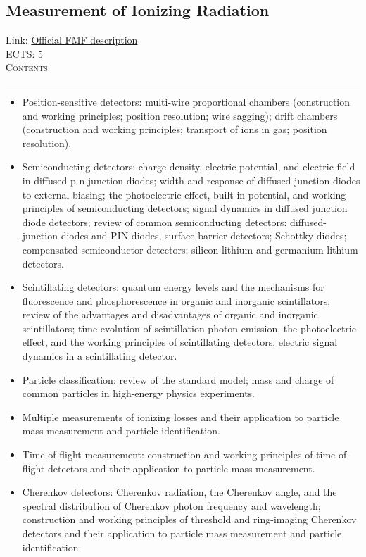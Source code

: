 \documentclass[11pt, a4paper]{article}
\newenvironment{course}[3]{
\subsection{#1}%
Link: \href{#2}{Official FMF description}\\%
ECTS: #3%
\vspace{1ex}
\\
{\large \textsc{Contents}}\\[-0.9ex]%
\rule{\textwidth}{0.5pt}
\vspace{-3ex}
}
{}
\newenvironment{chapter}[1]{
\begin{tcolorbox}[title=#1, breakable]
}
{\end{tcolorbox}}
\begin{document}
\begin{course}{Measurement of Ionizing Radiation}{https://www.fmf.uni-lj.si/en/study-physics/programmes/1fiz/2020/7000777/courses/1446/}{5}
\begin{chapter}{Particle detectors}
\begin{itemize}
            \item Position-sensitive detectors: multi-wire proportional chambers (construction and working principles; position resolution; wire sagging); drift chambers (construction and working principles; transport of ions in gas; position resolution).

            \item Semiconducting detectors: charge density, electric potential, and electric field in diffused p-n junction diodes; width and response of diffused-junction diodes to external biasing; the photoelectric effect, built-in potential, and working principles of semiconducting detectors; signal dynamics in diffused junction diode detectors; review of common semiconducting detectors: diffused-junction diodes and PIN diodes, surface barrier detectors; Schottky diodes; compensated semiconductor detectors; silicon-lithium and germanium-lithium detectors.

            \item Scintillating detectors: quantum energy levels and the mechanisms for fluorescence and phosphorescence in organic and inorganic scintillators; review of the advantages and disadvantages of organic and inorganic scintillators; time evolution of scintillation photon emission, the photoelectric effect, and the working principles of scintillating detectors; electric signal dynamics in a scintillating detector.

        \end{itemize}
    \end{chapter}

    \begin{chapter}{Particle identification}
        \begin{itemize}
        
            \item Particle classification: review of the standard model; mass and charge of common particles in high-energy physics experiments.

            \item Multiple measurements of ionizing losses and their application to particle mass measurement and particle identification.

            \item Time-of-flight measurement: construction and working principles of time-of-flight detectors and their application to particle mass measurement.

            \item Cherenkov detectors: Cherenkov radiation, the Cherenkov angle, and the spectral distribution of Cherenkov photon frequency and wavelength; construction and working principles of threshold and ring-imaging Cherenkov detectors and their application to particle mass measurement and particle identification.


\end{itemize}
\end{chapter}
\end{course}
\end{document}
